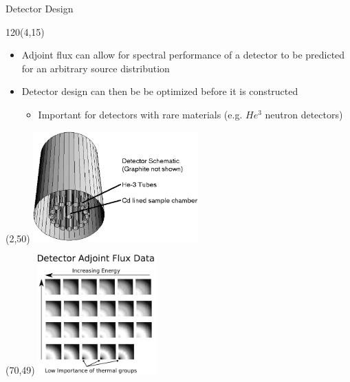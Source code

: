 \documentclass{beamer}
\begin{document}
\begin{frame}{Detector Design}
  
  \begin{textblock}{120}(4,15)
    \begin{itemize}
      \item Adjoint flux can allow for spectral performance of a detector to be 
        predicted for an arbitrary source distribution
        \medskip
      \item Detector design can then be be optimized before it is constructed
        \smallskip
        \begin{itemize}
          \item Important for detectors with rare materials (e.g. $He^3$ 
            neutron detectors)
        \end{itemize}
    \end{itemize}
  \end{textblock}

  \begin{textblock}{20}(2,50)
    \includegraphics[width=2.5in]{figures/He3_detector.png}
  \end{textblock}

  \begin{textblock}{20}(70,49)
    \includegraphics[width=1.8in]{figures/He3_detector_adjoint_data_modified.pdf}
  \end{textblock}

\end{frame}

\end{document}
